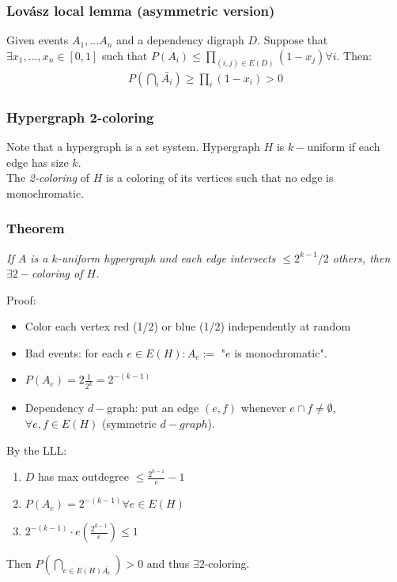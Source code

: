 \subsubsection{Lovász local lemma (asymmetric version)}
Given events $A_1,...A_n$ and a dependency digraph $D$.
Suppose that $\exists x_1, ..., x_n \in [0,1]$ such that $P(A_i) \leq \prod_{(i,j) \in E(D)}(1 - x_j) \forall i$. Then:
\begin{eqnarray}
	P(\bigcap_i \bar{A_i}) \geq \prod_i (1 - x_i) > 0
\end{eqnarray}

\subsubsection{Hypergraph 2-coloring}
Note that a hypergraph is a set system. Hypergraph $H$ is $k-$uniform if each edge has size $k$.\\

The \textit{2-coloring} of $H$ is a coloring of its vertices such that no edge is monochromatic.

\subsubsection{Theorem} 
\textit{If $A$ is a $k$-uniform hypergraph and each edge intersects $\leq 2^{k-1}/2$ others, then $\exists 2-$coloring of $H$.\\}

Proof: \begin{itemize}
	\item Color each vertex red (1/2) or blue (1/2) independently at random
	\item Bad events: for each $e \in E(H) : A_e := $ "$e$ is monochromatic".
	\item $P(A_e) = 2 \frac{1}{2^k} = 2^{-(k-1)}$
	\item Dependency $d-$graph: put an edge $(e,f)$ whenever $e \cap f \neq \emptyset$, $\forall e, f \in E(H)$ (symmetric $d-graph$).
\end{itemize}

By the LLL: 
	\begin{enumerate}
		\item $D$ has max outdegree $\leq \frac{2^{k-1}}{e} -1$
		\item $P(A_e) = 2^{-(k-1)} \forall e \in E(H)$
		\item $2^{-(k-1)} \cdot e  \left( \frac{2^{k-1}}{e} \right) \leq 1$
	\end{enumerate} 
	Then $P(\bigcap_{e \in E(H) \bar{A_e}}) > 0$ and thus $\exists 2$-coloring.

